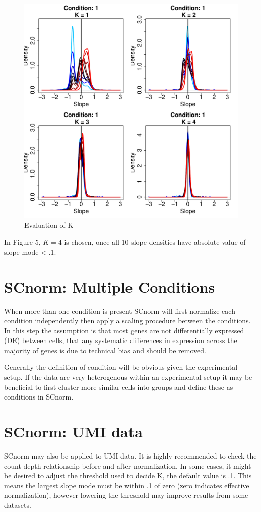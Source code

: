 \documentclass{article}
\begin{document}
\begin{figure}[h!]
\centering
\includegraphics[width=.5\textwidth]{MyNormalizedData_k_evaluation.pdf}
\caption{Evaluation of K}
\end{figure}



In Figure 5, $K = 4$ is chosen, once all 10 slope densities have absolute value of slope mode < .1.


\section{SCnorm: Multiple Conditions}
When more than one condition is present SCnorm will first normalize each condition independently then apply a scaling procedure between the conditions. In this step the assumption is that most genes are not differentially expressed (DE) between cells, that any systematic differences in expression across the majority of genes is due to technical bias and should be removed.

Generally the definition of condition will be obvious given the experimental setup. If the data are very heterogenous within an experimental setup it may be beneficial to first cluster more similar cells into groups and define these as conditions in SCnorm.

\section{SCnorm: UMI data}
SCnorm may also be applied to UMI data. It is highly recommended to check the count-depth relationship before and after normalization. In some cases, it might be desired to adjust the threshold used to decide K, the default value is .1. This means the largest slope mode must be within .1 of zero (zero indicates effective normalization), however lowering the threshold may improve results from some datasets. 
\end{document}
